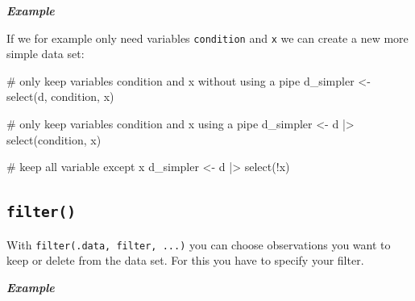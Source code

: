 \documentclass[
  letterpaper,
  DIV=11,
  numbers=noendperiod,
  oneside]{scrreprt}
\newenvironment{Shaded}{\begin{snugshade}}{\end{snugshade}}
\newcommand{\CommentTok}[1]{\textcolor[rgb]{0.37,0.37,0.37}{#1}}
\newcommand{\FunctionTok}[1]{\textcolor[rgb]{0.28,0.35,0.67}{#1}}
\newcommand{\NormalTok}[1]{\textcolor[rgb]{0.00,0.23,0.31}{#1}}
\newcommand{\OtherTok}[1]{\textcolor[rgb]{0.00,0.23,0.31}{#1}}
\newcommand{\SpecialCharTok}[1]{\textcolor[rgb]{0.37,0.37,0.37}{#1}}
\begin{document}
\textbf{\emph{Example}}

If we for example only need variables \texttt{condition} and \texttt{x}
we can create a new more simple data set:

\begin{Shaded}
\begin{Highlighting}[]
\CommentTok{\# only keep variables condition and x without using a pipe}
\NormalTok{d\_simpler }\OtherTok{\textless{}{-}} \FunctionTok{select}\NormalTok{(d, condition, x)}

\CommentTok{\# only keep variables condition and x using a pipe}
\NormalTok{d\_simpler }\OtherTok{\textless{}{-}}\NormalTok{ d }\SpecialCharTok{|\textgreater{}} \FunctionTok{select}\NormalTok{(condition, x)}

\CommentTok{\# keep all variable except x}
\NormalTok{d\_simpler }\OtherTok{\textless{}{-}}\NormalTok{ d }\SpecialCharTok{|\textgreater{}} \FunctionTok{select}\NormalTok{(}\SpecialCharTok{!}\NormalTok{x)}
\end{Highlighting}
\end{Shaded}

\hypertarget{filter}{%
\subsection{\texorpdfstring{\texttt{filter()}}{filter()}}\label{filter}}

With \texttt{filter(.data,\ filter,\ ...)} you can choose observations
you want to keep or delete from the data set. For this you have to
specify your filter.

\textbf{\emph{Example}}
\end{document}
